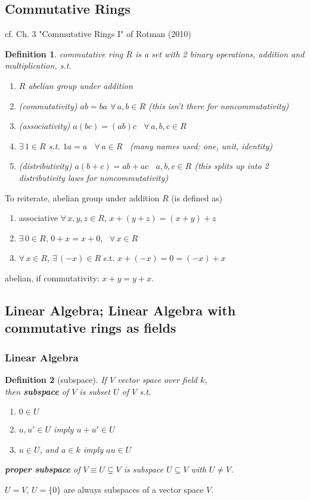 \documentclass[10pt]{amsart}
\newtheorem{definition}{Definition}
\begin{document}
\begin{multicols*}{2}
\section{Commutative Rings}

cf. Ch. 3 "Commutative Rings I" of Rotman (2010) \cite{JRotman2010}


\begin{definition} commutative ring $R$ is a set with 2 binary operations, addition and multiplication, s.t.
	\begin{enumerate}
		\item[(i)] $R$ abelian group under addition 
		\item[(ii)] (commutativity) $ab=ba$ \quad $\forall \, a,b \in R$  (this isn't there for noncommutativity)
		\item[(iii)] (associativity) $a(bc) = (ab)c$ \quad \, $\forall \, a,b,c\in R$
		\item[(iv)] $\exists \, 1 \in R$ s.t. $1a = a$ \, $\forall \, a  \in R$ \quad \, (many names used: one, unit, identity)
		\item[(v)] (distributivity) $a(b+c) = ab+ac$ \quad \, $a,b,c \in R$ (this splits up into 2 distributivity laws for noncommutativity)
	\end{enumerate}
\end{definition}

To reiterate, abelian group under addition $R$ (is defined as)
\begin{enumerate}
	\item associative $\forall \, x , y ,z \in R$, $x + (y+z) = (x+y)+z$ 
	\item $\exists \, 0 \in R$, $0+x = x + 0$, \, $\forall \, x \in R$ 
	\item $\forall \, x \in R$, $\exists \, (-x) \in R$ s.t. $x+(-x) = 0 = (-x) + x$
\end{enumerate}
abelian, if commutativity: $x+y=y+x$.  

\subsection{Linear Algebra; Linear Algebra with commutative rings as fields}

\subsubsection{Linear Algebra}

\begin{definition}[subspace]
	If $V$ vector space over field $k$, \\
	then \textbf{subspace} of $V$ is subset $U$ of $V$ s.t. 
	\begin{enumerate}
		\item $0\in U$
		\item $u,u' \in U$ imply $u+u' \in U$ 
		\item $u\in U$, and $a\in k$ imply $au \in U$
	\end{enumerate}
	\textbf{proper subspace} of $V \equiv U \subsetneq V$ is subspace $U \subseteq V$ with $U \neq V$.
\end{definition}
$U =V$, $U = \lbrace 0 \rbrace$ are always subspaces of a vector space $V$. 


\end{multicols*}
\end{document}
